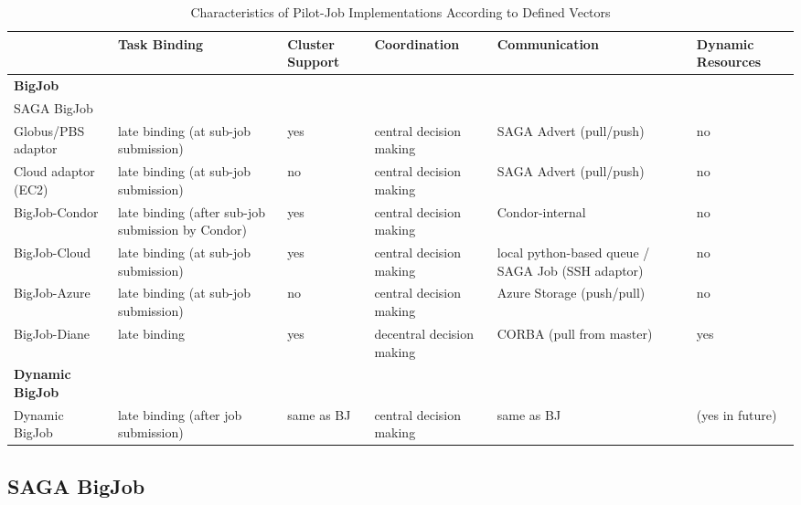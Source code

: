 \documentclass[]{article}
\begin{document}
\begin{table}[t]
\begin{tabular}{|l|p{2.5cm}|p{2cm}|p{2cm}|p{2cm}|p{2cm}|}
	\hline
	&\textbf{Task Binding} &\textbf{Cluster Support} &\textbf{Coordina\-tion} & \textbf{Communica\-tion} &\textbf{Dynamic Resources}\\
	\hline
	\textbf{BigJob} & &&&&\\
	\hline
	SAGA BigJob & &&&&\\
	\hline
	\hspace{4mm} Globus/PBS adaptor  &late binding (at sub-job submission)  
									 &yes &central decision making &SAGA Advert (pull/push) &no\\  
	\hline
	\hspace{4mm} Cloud adaptor (EC2) &late binding (at sub-job submission)  
									 &no &central decision making &SAGA Advert (pull/push) &no\\ 
    \hline
   BigJob-Condor &late binding (after sub-job submission by Condor) &yes &central decision making &Condor-internal &no\\
	\hline
 	BigJob-Cloud &late binding (at sub-job submission) &yes &central decision making 
				 &local python-based queue / SAGA Job (SSH adaptor) &no\\ 
	\hline
	BigJob-Azure &late binding (at sub-job submission)
	             &no &central decision making &Azure Storage (push/pull) &no\\ 
	\hline
    BigJob-Diane &late binding  &yes &decentral decision making &CORBA (pull from master) &yes\\ 
	\hline	
	\textbf{Dynamic BigJob} & &&&&\\
	\hline
    Dynamic BigJob &late binding (after job submission) &same as BJ &central decision making &same as BJ &(yes in future)\\
    \hline
\end{tabular}
\caption{Characteristics of Pilot-Job Implementations According 
		to Defined Vectors} \label{tab:pilotjob_overview}
\end{table}		



\subsection{SAGA BigJob}
\end{document}

